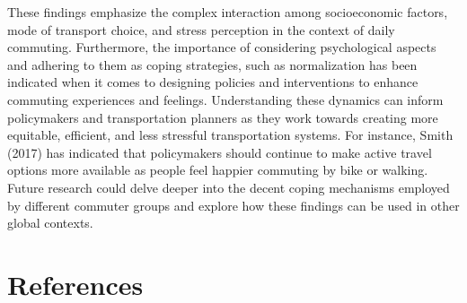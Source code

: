 \documentclass[
11pt, %
oneside, %
english, %
singlespacing, %
]{macthesis} %
\begin{document}
These findings emphasize the complex interaction among socioeconomic factors, mode of transport choice, and stress perception in the context of daily commuting. Furthermore, the importance of considering psychological aspects and adhering to them as coping strategies, such as normalization has been indicated when it comes to designing policies and interventions to enhance commuting experiences and feelings. Understanding these dynamics can inform policymakers and transportation planners as they work towards creating more equitable, efficient, and less stressful transportation systems. For instance, Smith (2017) has indicated that policymakers should continue to make active travel options more available as people feel happier commuting by bike or walking. Future research could delve deeper into the decent coping mechanisms employed by different commuter groups and explore how these findings can be used in other global contexts.

\backmatter

\hypertarget{references}{%
\chapter*{References}\label{references}}


\noindent

\setlength{\parindent}{-0.20in}
\setlength{\leftskip}{0.20in}
\setlength{\parskip}{8pt}
\end{document}
